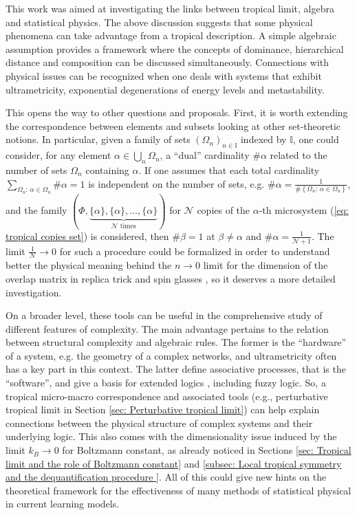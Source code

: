 \documentclass[11pt,british,reqno]{article}
\numberwithin{equation}{section}
\numberwithin{figure}{section}
\numberwithin{table}{section}
\theoremstyle{definition}
\theoremstyle{definition}
\theoremstyle{plain}
\theoremstyle{plain}
\theoremstyle{remark}
\theoremstyle{plain}
\numberwithin{equation}{section}
\numberwithin{figure}{section}
\numberwithin{table}{section}
\theoremstyle{plain}
\begin{document}
This work was aimed at investigating the links between tropical limit, algebra and statistical physics. 
The above discussion suggests that some physical phenomena can take advantage from a tropical description. A simple algebraic assumption provides a framework where the concepts of dominance, hierarchical distance and composition can be discussed simultaneously. Connections with physical issues can be recognized when one deals with systems that exhibit  ultrametricity, exponential degenerations of energy levels and metastability. 

This opens the way to other questions and proposals. First, it is worth extending the correspondence between elements and subsets looking at other set-theoretic notions. In particular, given a family of sets $\left(\Omega_{n}\right)_{n\in\mathbb{I}}$
indexed by $\mathbb{I}$, one could consider, for any element ${\displaystyle \alpha\in\bigcup_{n}\Omega_{n}}$, a ``dual'' cardinality $\#\alpha$ related to the number of sets $\Omega_{n}$ containing
$\alpha$. If one assumes that each total cardinality ${\displaystyle \sum_{\Omega_{n}:\,\alpha\in\Omega_{n}}\#\alpha=1}$ is 
independent on the number of sets, e.g. ${\displaystyle \#\alpha=\frac{1}{\#\left\{ \Omega_{n}:\,\alpha\in\Omega_{n}\right\} }}$, and the family $(\Phi,\underset{\mathcal{N}\mbox{ times}}{\underbrace{\{\alpha\},\{\alpha\},\dots,\{\alpha\}}})$ for $\mathcal{N}$ copies of the $\alpha$-th microsystem (\ref{eq: tropical copies set}) 
is considered, then $\#\beta=1$ at
$\beta\neq\alpha$ and ${\displaystyle \#\alpha=\frac{1}{\mathcal{N}+1}}$.
The limit ${\displaystyle \frac{1}{\mathcal{N}}\rightarrow0}$ for such a procedure could be formalized in order to understand better the physical meaning behind the $n\rightarrow0$ limit for the dimension of the overlap matrix in replica trick and spin glasses \cite{Parisi1980}, so it deserves a more detailed investigation.

On a broader level, these tools can be useful in the comprehensive
study of different features of complexity. The main advantage pertains to the relation between structural complexity and algebraic rules. The former is the ``hardware'' of a system, e.g. the geometry of a complex networks, and ultrametricity often has a key part in this context. The latter define associative processes, that is the ``software'', and give a basis for extended logics \cite{GuidoToto2008}, including fuzzy logic. So, a tropical micro-macro correspondence and associated tools (e.g., perturbative tropical limit in Section \ref{sec: Perturbative tropical limit})
can help explain connections between the physical structure of complex systems and their underlying logic. This also comes with the dimensionality issue induced by the limit $k_{B}\rightarrow0$ for Boltzmann constant, as already noticed in Sections \ref{sec: Tropical limit and the role of Boltzmann constant} and \ref{subsec: Local tropical symmetry and the dequantification procedure }.
All of this could give new hints on the theoretical framework for
the effectiveness of many methods of statistical physical in current
learning models. 
\end{document}
